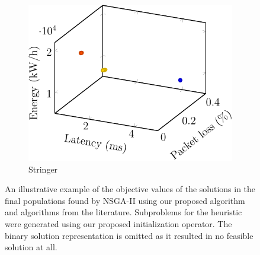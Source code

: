 \begin{figure}[t!]
\begin{subfigure}[b]{0.32\linewidth}
        \includegraphics[width=\textwidth]{graphs/comparison/stringer-crop}
        \caption{Stringer \cite{ChuaWZSH16}}
    \end{subfigure}

    \vspace{1em}
    \caption{An illustrative example of the objective values of the solutions in the final populations found by NSGA-II using our proposed algorithm and algorithms from the literature. Subproblems for the heuristic were generated using our proposed initialization operator. The binary solution representation is omitted as it resulted in no feasible solution at all.}
    \label{fig:alg_objectives}
\end{figure}

